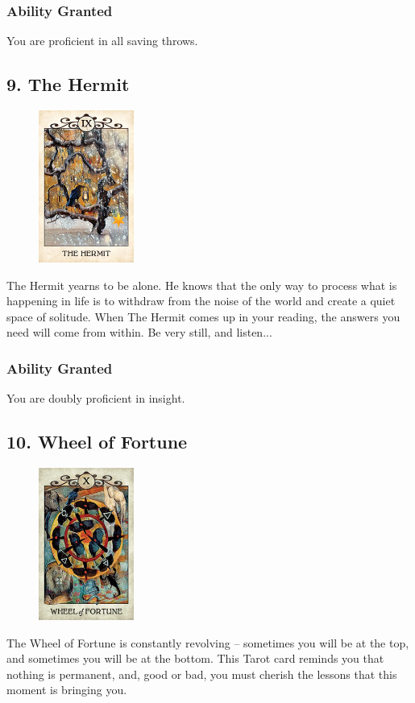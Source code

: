 \documentclass[10pt,twoside,twocolumn,openany,nodeprecatedcode]{dndbook}
\begin{document}
    \subsubsection*{Ability Granted}
    You are proficient in all saving throws.

    \subsection*{9. The Hermit}

    \begin{figure}
        \includegraphics[height=5cm,width=\linewidth]{hermit.jpg}
    \end{figure}
    The Hermit yearns to be alone. He knows that the only way to process what is happening in life is to withdraw from the noise of the world and create a quiet space of solitude. When The Hermit comes up in your reading, the answers you need will come from within. Be very still, and listen...
    \vspace*{10pt}
    \subsubsection*{Ability Granted}
    You are doubly proficient in insight.

    \newpage

    \subsection*{10. Wheel of Fortune}

    \begin{figure}
        \includegraphics[height=5cm,width=\linewidth]{wheeloffortune.jpg}
    \end{figure}
    The Wheel of Fortune is constantly revolving -- sometimes you will be at the top, and sometimes you will be at the bottom. This Tarot card reminds you that nothing is permanent, and, good or bad, you must cherish the lessons that this moment is bringing you. 
    \vspace*{30pt}
\end{document}
